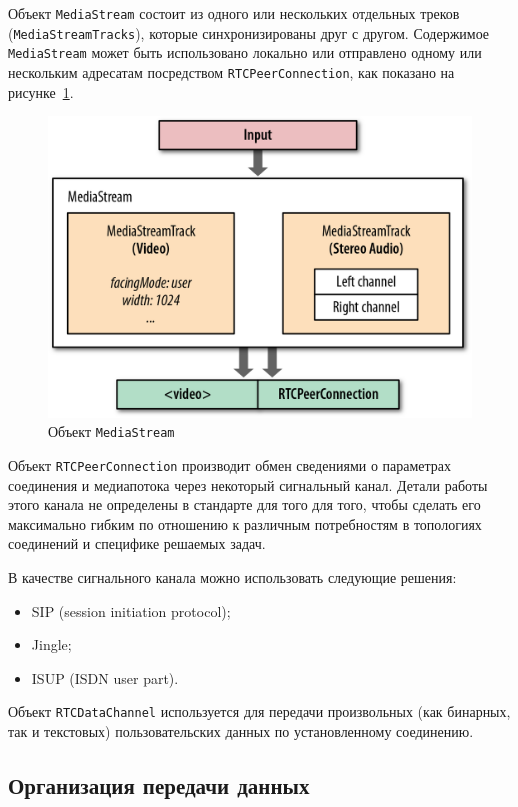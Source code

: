 Объект \texttt{MediaStream} состоит из одного или нескольких отдельных треков 
(\texttt{MediaStreamTracks}), которые синхронизированы друг с другом. Содержимое
\texttt{MediaStream} может быть использовано локально или отправлено одному или
нескольким адресатам посредством \texttt{RTCPeerConnection}, 
как показано на рисунке~\ref{pic:webrtc_mediastream}.

\begin{figure}[h!]
  \centering
  \includegraphics[width=150mm]{pic/webrtc_mediastream.png}
  \caption{Объект \texttt{MediaStream}}
  \label{pic:webrtc_mediastream}
\end{figure}

Объект \texttt{RTCPeerConnection} производит обмен сведениями о параметрах соединения и
медиапотока через некоторый сигнальный канал. Детали работы этого канала не определены
в стандарте для того для того, чтобы сделать его максимально гибким по отношению к
различным потребностям в топологиях соединений и специфике решаемых задач.

В качестве сигнального канала можно использовать следующие решения:
\begin{itemize}
\item SIP (session initiation protocol);
\item Jingle;
\item ISUP (ISDN user part).
\end{itemize}

Объект \texttt{RTCDataChannel} используется для передачи произвольных 
(как бинарных, так и текстовых) пользовательских данных по установленному соединению.

\subsection{Организация передачи данных}
\label{ssec:webrtc_transmission}


